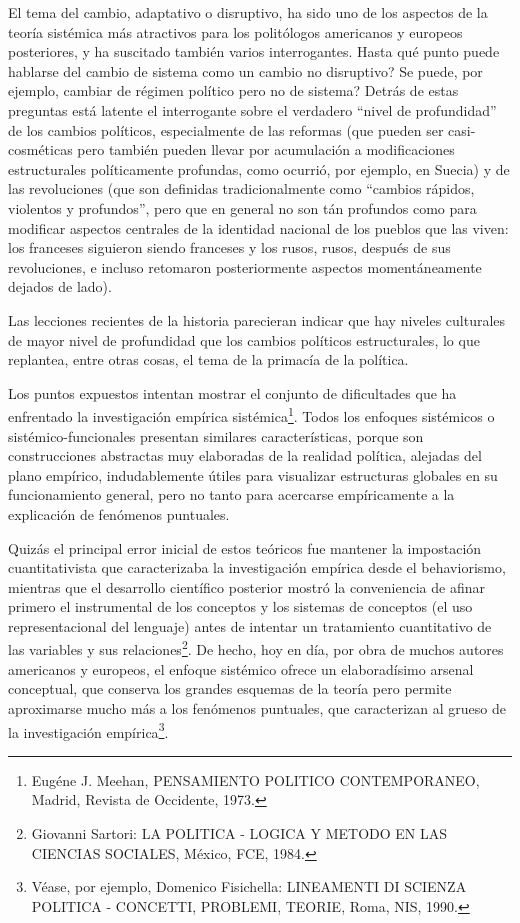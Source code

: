 \documentclass[
]{book}
\begin{document}
El tema del cambio, adaptativo o disruptivo, ha sido uno de los aspectos de la teoría sistémica más atractivos para los politólogos americanos y europeos posteriores, y ha suscitado también varios interrogantes. Hasta qué punto puede hablarse del cambio de sistema como un cambio no disruptivo? Se puede, por ejemplo, cambiar de régimen político pero no de sistema? Detrás de estas preguntas está latente el interrogante sobre el verdadero ``nivel de profundidad'' de los cambios políticos, especialmente de las reformas (que pueden ser casi-cosméticas pero también pueden llevar por acumulación a modificaciones estructurales políticamente profundas, como ocurrió, por ejemplo, en Suecia) y de las revoluciones (que son definidas tradicionalmente como ``cambios rápidos, violentos y profundos'', pero que en general no son tán profundos como para modificar aspectos centrales de la identidad nacional de los pueblos que las viven: los franceses siguieron siendo franceses y los rusos, rusos, después de sus revoluciones, e incluso retomaron posteriormente aspectos momentáneamente dejados de lado).

Las lecciones recientes de la historia parecieran indicar que hay niveles culturales de mayor nivel de profundidad que los cambios políticos estructurales, lo que replantea, entre otras cosas, el tema de la primacía de la política.

Los puntos expuestos intentan mostrar el conjunto de dificultades que ha enfrentado la investigación empírica sistémica\footnote{Eugéne J. Meehan, PENSAMIENTO POLITICO CONTEMPORANEO, Madrid, Revista de Occidente, 1973.}. Todos los enfoques sistémicos o sistémico-funcionales presentan similares características, porque son construcciones abstractas muy elaboradas de la realidad política, alejadas del plano empírico, indudablemente útiles para visualizar estructuras globales en su funcionamiento general, pero no tanto para acercarse empíricamente a la explicación de fenómenos puntuales.

Quizás el principal error inicial de estos teóricos fue mantener la impostación cuantitativista que caracterizaba la investigación empírica desde el behaviorismo, mientras que el desarrollo científico posterior mostró la conveniencia de afinar primero el instrumental de los conceptos y los sistemas de conceptos (el uso representacional del lenguaje) antes de intentar un tratamiento cuantitativo de las variables y sus relaciones\footnote{Giovanni Sartori: LA POLITICA - LOGICA Y METODO EN LAS CIENCIAS SOCIALES, México, FCE, 1984.}. De hecho, hoy en día, por obra de muchos autores americanos y europeos, el enfoque sistémico ofrece un elaboradísimo arsenal conceptual, que conserva los grandes esquemas de la teoría pero permite aproximarse mucho más a los fenómenos puntuales, que caracterizan al grueso de la investigación empírica\footnote{Véase, por ejemplo, Domenico Fisichella: LINEAMENTI DI SCIENZA POLITICA - CONCETTI, PROBLEMI, TEORIE, Roma, NIS, 1990.}.
\end{document}
